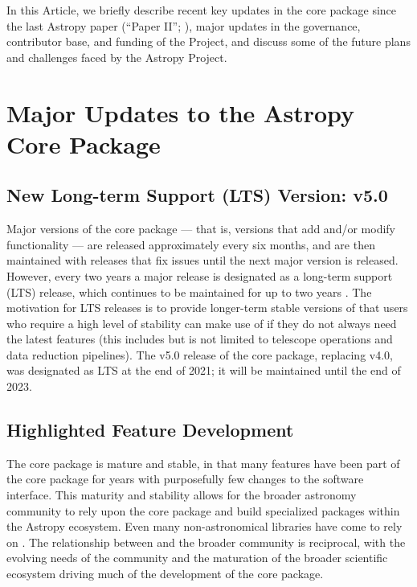 \documentclass[modern]{aastex631}
\newcommand{\secauthor}[1]{{\color{blue}Author:~\textit{#1}}}
\begin{document}
In this Article, we briefly describe recent key updates in the \astropypkg core
package since the last Astropy paper (``Paper II''; \citealt{astropy:2018}),
major updates in the governance, contributor base, and funding of the Project,
and discuss some of the future plans and challenges faced by the Astropy
Project.


\section{Major Updates to the Astropy Core Package} \label{sec:core-updates}

\subsection{New Long-term Support (LTS) Version: v5.0} \label{sec:core-v50}


Major versions of the core package --- that is, versions that add and/or modify
functionality --- are released approximately every six months, and are then
maintained with releases that fix issues until the next major version is
released. However, every two years a major release is designated as a long-term
support (LTS) release, which continues to be maintained for up to two years
\citep{ape2}. The motivation for LTS releases is to provide longer-term stable
versions of \astropypkg that users who require a high level of stability can
make use of if they do not always need the latest features (this includes but
is not limited to telescope operations and data reduction pipelines). The v5.0
release of the core package, replacing v4.0, was designated as LTS at the end of 2021;
it will be maintained until the end of 2023.

\subsection{Highlighted Feature Development} \label{sec:core-features}


The \astropypkg core package is mature and stable, in that many features have
been part of the core package for years with purposefully few changes to the
software interface. This maturity and stability allows for the broader
astronomy \python community to rely upon the \astropypkg core package and build
specialized packages within the Astropy ecosystem. Even many non-astronomical
\python libraries have come to rely on \astropypkg. The relationship between
\astropy and the broader \python community is reciprocal, with the evolving needs
of the community and the maturation of the broader scientific \python ecosystem
driving much of the development of the \astropypkg core package.
\end{document}
